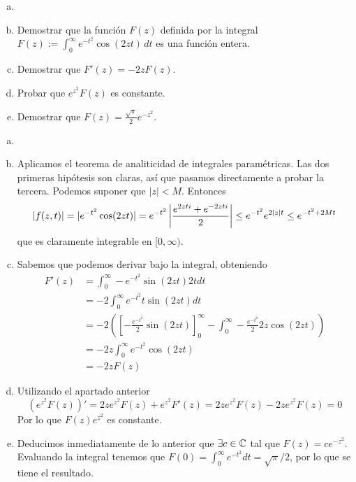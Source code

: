 \documentclass[twoside]{article}
\begin{document}
\newpage


\begin{ejercicio}{5}
\begin{enumerate}[a)]
\item[]
\item Demostrar que la función $F(z)$ definida por la integral
$\displaystyle{F(z):= \int_0^\infty e^{-t^2}\cos(2z t)\,dt}$
es una función entera.
\item Demostrar que $F'(z)=-2z F(z)$. 
\item Probar que $e^{z^2}F(z)$ es constante. 
\item Demostrar que  $F(z)=\frac{\sqrt{\pi}}{2}e^{-z^2}$. 
\end{enumerate} 
\end{ejercicio}
\begin{solucion}
\begin{enumerate}[a)]
\item[]
\item Aplicamos el teorema de analiticidad de integrales paramétricas. Las dos primeras hipótesis son claras, así que pasamos directamente a probar la tercera. Podemos suponer que $|z|<M$. Entonces
$$
|f(z,t)| = |e^{-t^2}\cos(2zt)| = e^{-t^2}\left\lvert\frac{e^{2zti}+e^{-2zti}}{2}\right\rvert\leq e^{-t^2}e^{2|z|t} \leq e^{-t^2 +2Mt}
$$
que es claramente integrable en $[0,\infty)$.
\item Sabemos que podemos derivar bajo la integral, obteniendo
\begin{align*}
F'(z)&=\int_0^\infty -e^{-t^2} \sin(2zt) 2t dt \\
&=-2 \int_0^\infty e^{-t^2}t \sin(2zt) dt\\
&=-2 \left( \left[-\frac{e^{-t^2}}{2}\sin(2zt)\right]^\infty_0 - \int_0^\infty  -\frac{e^{-t^2}}{2} 2z \cos(2zt) \right)\\
&= -2 z\int_0^\infty e^{-t^2}\cos(2zt)\\
&= -2zF(z)
\end{align*}
\item Utilizando el apartado anterior
$$
(e^{z^2}F(z))' = 2ze^{z^2}F(z) + e^{z^2}F'(z) =  2ze^{z^2}F(z) -  2ze^{z^2}F(z)  = 0
$$
Por lo que $F(z)e^{z^2}$ es constante.
\item Deducimos inmediatamente de lo anterior que $\exists c \in \mathbb{C}$ tal que $F(z)=ce^{-z^2}$. Evaluando la integral tenemos que $F(0)=\int_0^\infty e^{-t^2}dt = \sqrt{\pi}/2$, por lo que se tiene el resultado.
\end{enumerate}
\end{solucion}
\newpage
\end{document}
